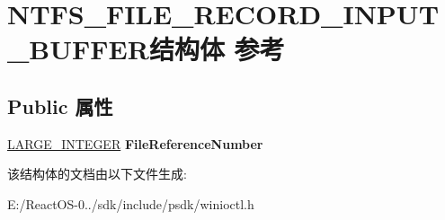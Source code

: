 \hypertarget{struct_n_t_f_s___f_i_l_e___r_e_c_o_r_d___i_n_p_u_t___b_u_f_f_e_r}{}\section{N\+T\+F\+S\+\_\+\+F\+I\+L\+E\+\_\+\+R\+E\+C\+O\+R\+D\+\_\+\+I\+N\+P\+U\+T\+\_\+\+B\+U\+F\+F\+E\+R结构体 参考}
\label{struct_n_t_f_s___f_i_l_e___r_e_c_o_r_d___i_n_p_u_t___b_u_f_f_e_r}
\subsection*{Public 属性}
\begin{DoxyCompactItemize}
\item 
\mbox{\label{struct_n_t_f_s___f_i_l_e___r_e_c_o_r_d___i_n_p_u_t___b_u_f_f_e_r_a5cfa2d953d1420e416a69c6e642b6a8d}} 
\hyperlink{union___l_a_r_g_e___i_n_t_e_g_e_r}{L\+A\+R\+G\+E\+\_\+\+I\+N\+T\+E\+G\+ER} {\bfseries File\+Reference\+Number}
\end{DoxyCompactItemize}


该结构体的文档由以下文件生成\+:\begin{DoxyCompactItemize}
\item 
E\+:/\+React\+O\+S-\/0../sdk/include/psdk/winioctl.\+h\end{DoxyCompactItemize}
